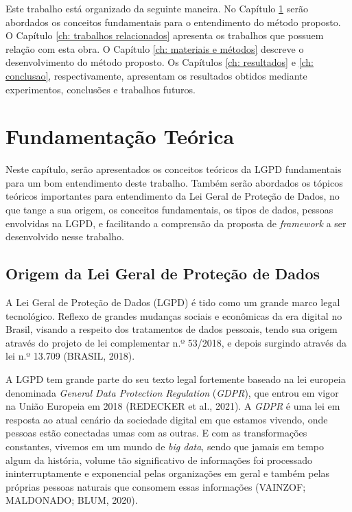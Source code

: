 \documentclass[
	12pt,				%
	openright,			%
	oneside,			%
	a4paper,			%
	english,			%
	french,				%
	spanish,			%
	brazil,				%
	]{abntex2}
\begin{document}
Este trabalho está organizado da seguinte maneira. No Capítulo \ref{ch: fundamentacao teorica} serão abordados os conceitos fundamentais para o entendimento do método proposto. O Capítulo \ref{ch: trabalhos relacionados} apresenta os trabalhos que possuem relação com esta obra. O Capítulo \ref{ch: materiais e métodos} descreve o desenvolvimento do método proposto. Os Capítulos \ref{ch: resultados} e \ref{ch: conclusao}, respectivamente, apresentam os resultados obtidos mediante experimentos, conclusões e trabalhos futuros.


\setcounter{chapter}{1}
\chapter{Fundamentação Teórica}
\label{ch: fundamentacao teorica}

Neste capítulo, serão apresentados os conceitos teóricos da LGPD fundamentais para um bom entendimento deste trabalho. Também serão abordados os tópicos teóricos importantes para entendimento da Lei Geral de Proteção de Dados, no que tange a sua origem, os conceitos fundamentais, os tipos de dados, pessoas envolvidas na LGPD, e facilitando a comprensão da proposta de \textit{framework} a ser desenvolvido nesse trabalho.

\section{Origem da Lei Geral de Proteção de Dados }
\label{sec: exemplo}

A Lei Geral de Proteção de Dados (LGPD) é tido como um grande marco legal tecnológico. Reflexo de grandes mudanças sociais e econômicas da era digital no Brasil, visando a respeito dos tratamentos de dados pessoais, tendo sua origem através do projeto de lei complementar n.º 53/2018, e depois surgindo através da lei n.º 13.709 (BRASIL, 2018). 

A LGPD tem grande parte do seu texto legal fortemente baseado na lei europeia denominada \textit{General Data Protection Regulation} (\textit{GDPR}), que entrou em vigor na União Europeia em 2018 (REDECKER et al., 2021). A \textit{GDPR} é uma lei em resposta ao atual cenário da sociedade digital em que estamos vivendo, onde pessoas estão conectadas umas com as outras. E com as transformações constantes, vivemos em um mundo de \textit{big data}, sendo que jamais em tempo algum da história, volume tão significativo de informações foi processado ininterruptamente e exponencial pelas organizações em geral e também pelas próprias pessoas naturais que consomem essas informações (VAINZOF; MALDONADO; BLUM, 2020).
\end{document}
